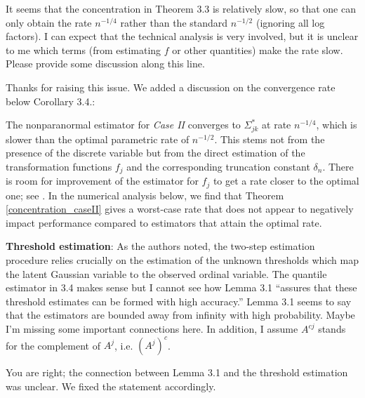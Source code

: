 \begin{point}
    It seems that the concentration in Theorem 3.3 is relatively slow, so that one can only obtain the rate \(n^{-1/4}\) rather than the standard \(n^{-1/2}\) (ignoring all log factors). I can expect that the technical analysis is very involved, but it is unclear to me which terms (from estimating \(f\) or other quantities) make the rate slow. Please provide some discussion along this line.
\end{point}

\begin{reply}
    Thanks for raising this issue. We added a discussion on the convergence rate below Corollary 3.4.:
\end{reply}

\begin{change}
    The nonparanormal estimator for \textit{Case II} converges to \(\Sigma_{jk}^*\) at rate \(n^{-1/4}\), which is slower than the optimal parametric rate of \(n^{-1/2}\). This stems not from the presence of the discrete variable but from the direct estimation of the transformation functions \({f}_j\) and the corresponding truncation constant \(\delta_n\). There is room for improvement of the estimator for \(f_j\) to get a rate closer to the optimal one; see \citep{Xue12}. In the numerical analysis below, we find that Theorem \ref{concentration_caseII} gives a worst-case rate that does not appear to negatively impact performance compared to estimators that attain the optimal rate.
\end{change}


\reviewersection

\begin{point}
    \textbf{Threshold estimation}: As the authors noted, the two-step estimation procedure relies crucially on the estimation of the unknown thresholds which map the latent Gaussian variable to the observed ordinal variable. The quantile estimator in 3.4 makes sense but I cannot see how Lemma 3.1 “assures that these threshold estimates can be formed with high accuracy.” Lemma 3.1 seems to say that the estimators are bounded away from infinity with high probability. Maybe I’m missing some important connections here. In addition, I assume \(A^{cj}\) stands for the complement of \(
    A^j\), i.e. \((A^j)^c\).
\end{point}

\begin{reply}
    You are right; the connection between Lemma 3.1 and the threshold estimation was unclear. We fixed the statement accordingly.
\end{reply}

